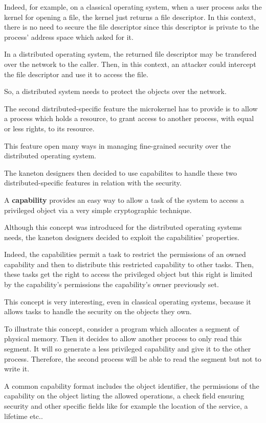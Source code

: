 \begin{multicols}{2}
Indeed, for example, on a classical operating system, when a user process
asks the kernel for opening a file, the kernel just returns a file descriptor.
In this context, there is no need to secure the file descriptor since
this descriptor is private to the process' address space which asked for it.

In a distributed operating system, the returned file descriptor may
be transfered over the network to the caller. Then, in this context,
an attacker could intercept the file descriptor and use it to access
the file.

So, a distributed system needs to protect the objects over the network.

The second distributed-specific feature the microkernel has to provide
is to allow a process which holds a resource, to grant access to another
process, with equal or less rights, to its resource.

This feature open many ways in managing fine-grained security over
the distributed operating system.

The kaneton designers then decided to use capabilites to handle these
two distributed-specific features in relation with the security.

A \textbf{capability} provides an easy way to allow a task of the
system to access a privileged object via a very simple cryptographic
technique.

Although this concept was introduced for the distributed operating systems
needs, the kaneton designers decided to exploit the capabilities' properties.

Indeed, the capabilities permit a task to restrict the permissions
of an owned capability and then to distribute this restricted capability
to other tasks. Then, these tasks get the right to access the privileged
object but this right is limited by the capability's permissions the
capability's owner previously set.

This concept is very interesting, even in classical operating systems,
because it allows tasks to handle the security on the objects they own.

To illustrate this concept, consider a program which allocates a segment of
physical memory. Then it decides to allow another process to only read
this segment. It will so generate a less privileged capability and give
it to the other process. Therefore, the second process will be able to read
the segment but not to write it.

A common capability format includes the object identifier, the permissions
of the capability on the object listing the allowed operations, a check field
ensuring security and other specific fields like for example the location
of the service, a lifetime etc..


\end{multicols}

